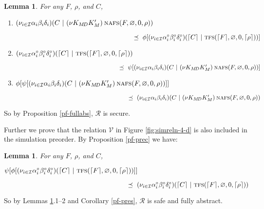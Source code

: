 \documentclass[10pt]{article}
\newtheorem{lemma}[theorem]{Lemma}
\newcommand{\new}[2]{(\nu #1)\:#2}
\newcommand{\betac}{\beta^\circ}
\newcommand{\alphac}{\alpha^\circ}
\newcommand{\deltac}{\delta^\circ}
\begin{document}
\begin{lemma}\label{dynamic-lemma} For any $F$, $\rho$, and $C$,
\begin{enumerate}
\item $(\nu_{i \in \mathcal I}\alpha_i\beta_i\delta_i)(C~|~\new{K_{M\!D}K'_M}\textsc{nafs}(F,\varnothing,0,\rho)) $
\par $~~~~~~~~~~~~~~~~~~~~~~~~~~~~~~~~~~~~~~~~~~~~~~~~~~~~~~~\preceq~ \phi[(\nu_{i \in \mathcal I}\alphac_i\betac_i\deltac_i)(\lceil C\rceil~|~\textsc{tfs}(\lceil F\rceil,\varnothing,0,\lceil \rho\rceil))] $
\item $(\nu_{i \in \mathcal I}\alphac_i\betac_i\deltac_i)(\lceil C\rceil~|~\textsc{tfs}(\lceil F\rceil,\varnothing,0,\lceil \rho\rceil))$
\par $~~~~~~~~~~~~~~~~~~~~~~~~~~~~~~~~~~~~~~~~~~~~~~~~~~\preceq ~ \psi[(\nu_{i \in \mathcal I}\alpha_i\beta_i\delta_i)(C~|~\new{K_{M\!D}K'_M}\textsc{nafs}(F,\varnothing,0,\rho))] $
\item $\phi[\psi[(\nu_{i \in \mathcal I}\alpha_i\beta_i\delta_i)(C~|~\new{K_{M\!D}K'_M}\textsc{nafs}(F,\varnothing,0,\rho))]] $
\par $~~~~~~~~~~~~~~~~~~~~~~~~~~~~~~~~~~~~~~~~~~~~~~~~~~~~~~~\preceq ~ (\nu_{i \in \mathcal I}\alpha_i\beta_i\delta_i)(C~|~\new{K_{M\!D}K'_M}\textsc{nafs}(F,\varnothing,0,\rho))$
\end{enumerate}
\end{lemma}
So by Proposition \ref{pf-fullabs}, $\mathcal R$ is secure. 

Further we prove that the relation $\mathcal V$ in Figure \ref{fig:simreln-4-d} is also included in the simulation preorder. By Proposition \ref{pf-prec} we have: 
\begin{lemma}\label{dynamic-safetylemma} For any $F$, $\rho$, and $C$, 
\vspace{0.2cm}
\par $\psi[\phi[(\nu_{i \in \mathcal I}\alphac_i\betac_i\deltac_i)(\lceil C\rceil~|~\textsc{tfs}(\lceil F\rceil,\varnothing,0,\lceil \rho\rceil))]] $
\par $~~~~~~~~~~~~~~~~~~~~~~~~~~~~~~~~~~~~~~~~~~~~~~~~~~~~~~~~~\preceq ~ (\nu_{i \in \mathcal I}\alphac_i\betac_i\deltac_i)(\lceil C\rceil~|~\textsc{tfs}(\lceil F\rceil,\varnothing,0,\lceil \rho\rceil))$
\end{lemma}
So by Lemmas \ref{dynamic-lemma}.1--2 and Corollary \ref{pf-pres}, $\mathcal R$ is safe and fully abstract. 
\end{document}
